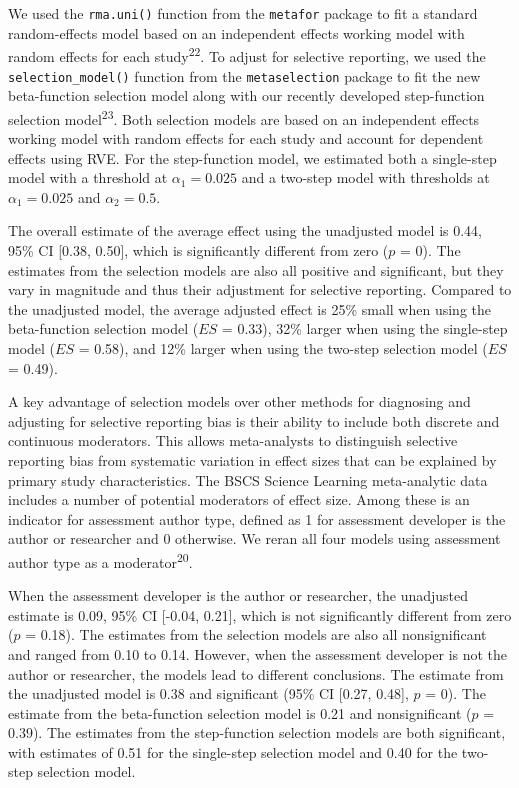 \documentclass[
  american,
  man, donotrepeattitle,floatsintext]{apa7}
\begin{document}
We used the \texttt{rma.uni()} function from the \texttt{metafor} package to fit a standard random-effects model based on an independent effects working model with random effects for each study\textsuperscript{22}. To adjust for selective reporting, we used the \texttt{selection\_model()} function from the \texttt{metaselection} package to fit the new beta-function selection model along with our recently developed step-function selection model\textsuperscript{23}. Both selection models are based on an independent effects working model with random effects for each study and account for dependent effects using RVE. For the step-function model, we estimated both a single-step model with a threshold at \(\alpha_1 = 0.025\) and a two-step model with thresholds at \(\alpha_1 = 0.025\) and \(\alpha_2 = 0.5\).

The overall estimate of the average effect using the unadjusted model is 0.44, 95\% CI {[}0.38, 0.50{]}, which is significantly different from zero (\(p\) = 0). The estimates from the selection models are also all positive and significant, but they vary in magnitude and thus their adjustment for selective reporting. Compared to the unadjusted model, the average adjusted effect is 25\% small when using the beta-function selection model (\(ES\) = 0.33), 32\% larger when using the single-step model (\(ES\) = 0.58), and 12\% larger when using the two-step selection model (\(ES\) = 0.49).

A key advantage of selection models over other methods for diagnosing and adjusting for selective reporting bias is their ability to include both discrete and continuous moderators. This allows meta-analysts to distinguish selective reporting bias from systematic variation in effect sizes that can be explained by primary study characteristics. The BSCS Science Learning meta-analytic data includes a number of potential moderators of effect size. Among these is an indicator for assessment author type, defined as 1 for assessment developer is the author or researcher and 0 otherwise. We reran all four models using assessment author type as a moderator\textsuperscript{20}.

When the assessment developer is the author or researcher, the unadjusted estimate is 0.09, 95\% CI {[}-0.04, 0.21{]}, which is not significantly different from zero (\(p\) = 0.18). The estimates from the selection models are also all nonsignificant and ranged from
0.10 to 0.14. However, when the assessment developer is not the author or researcher, the models lead to different conclusions. The estimate from the unadjusted model is 0.38 and significant (95\% CI {[}0.27, 0.48{]}, \(p\) = 0). The estimate from the beta-function selection model is 0.21 and nonsignificant (\(p\) = 0.39).
The estimates from the step-function selection models are both significant, with estimates of 0.51 for the single-step selection model and 0.40 for the two-step selection model.
\end{document}

